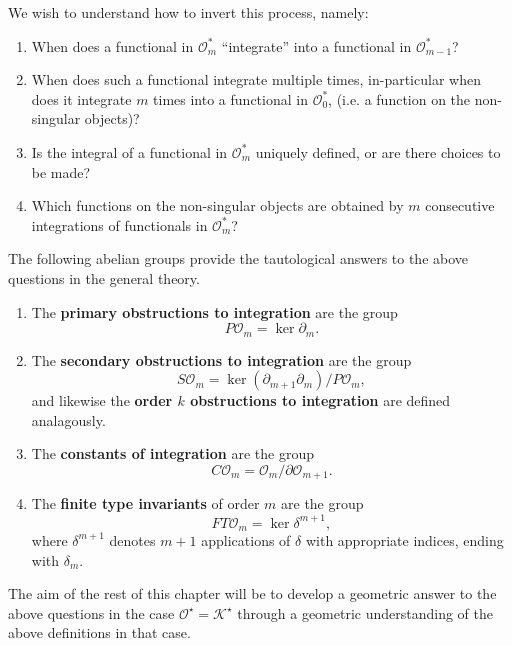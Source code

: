 We wish to understand how to invert this process, namely:
\begin{questions}
	\label{qu:integration-theory}
	\begin{enumerate}
		\item When does a functional in \(\mathcal{O}^{\ast}_{m}\) ``integrate'' into a functional in \(\mathcal{O}^{\ast}_{m - 1}\)?
		\item When does such a functional integrate multiple times, in-particular when does it integrate \(m\) times into a functional in \(\mathcal{O}^{\ast}_{0}\), (i.e. a function on the non-singular objects)?
		\item Is the integral of a functional in \(\mathcal{O}_{m}^{\ast}\) uniquely defined, or are there choices to be made?
		\item Which functions on the non-singular objects are obtained by \(m\) consecutive integrations of functionals in \(\mathcal{O}_{m}^{\ast}\)?
	\end{enumerate}
\end{questions}
The following abelian groups provide the tautological answers to the above questions in the general theory.
\begin{definitions}
	\label{def:integration-theory-groups}
	\begin{enumerate}
		\item The \textbf{primary obstructions to integration} are the group
			\[P\mathcal{O}_{m} = \ker{\partial_{m}}.\]
		\item The \textbf{secondary obstructions to integration} are the group
			\[S\mathcal{O}_{m} = \ker{(\partial_{m + 1}\partial_{m})} / P\mathcal{O}_{m},\]
			and likewise the \textbf{order \(k\) obstructions to integration} are defined analagously.
		\item The \textbf{constants of integration} are the group
			\[C\mathcal{O}_{m} = \mathcal{O}_{m} / \partial \mathcal{O}_{m + 1}.\]
		\item The \textbf{finite type invariants} of order \(m\) are the group
			\[FT\mathcal{O}_{m} = \ker \delta^{m + 1},\]
			where \(\delta^{m + 1}\) denotes \(m + 1\) applications of \(\delta\) with appropriate indices, ending with \(\delta_{m}\).

	\end{enumerate}
\end{definitions}
The aim of the rest of this chapter will be to develop a geometric answer to the above questions in the case \(\mathcal{O}^{\star} = \mathcal{K}^{\star}\) through a geometric understanding of the above definitions in that case.



